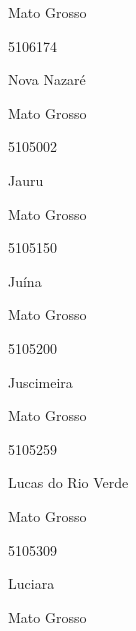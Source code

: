 \documentclass[
  letterpaper,
]{report}
\begin{document}
\n    

\n    

\n      

Mato Grosso

\n      

5106174

\n      

Nova Nazaré

\n    

\n    

\n      

Mato Grosso

\n      

5105002

\n      

Jauru

\n    

\n    

\n      

Mato Grosso

\n      

5105150

\n      

Juína

\n    

\n    

\n      

Mato Grosso

\n      

5105200

\n      

Juscimeira

\n    

\n    

\n      

Mato Grosso

\n      

5105259

\n      

Lucas do Rio Verde

\n    

\n    

\n      

Mato Grosso

\n      

5105309

\n      

Luciara

\n    

\n    

\n      

Mato Grosso

\n      
\end{document}
